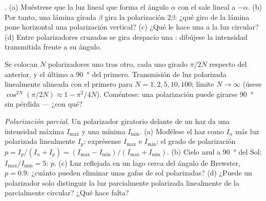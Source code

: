 \begin{exercise}[$\star\star$]\label{exo:b2:plane-waves-polarization:7}
. (a) Muéstrese que la luz lineal que forma el ángulo $\alpha$ con el
 sale lineal a $-\alpha$. (b) Por tanto, una lámina girada $\beta$
gira la polarización $2\beta$: ¿qué giro de la lámina pone horizontal una
polarización vertical? (c) ¿Qué le hace una  a la
luz circular? (d) Entre polarizadores cruzados se gira despacio una : dibújese la intensidad transmitida frente a su ángulo.
\end{exercise}

\begin{exercise}[$\star\star$]\label{exo:b2:plane-waves-polarization:8}
Se colocan $N$ polarizadores uno tras otro, cada uno girado $\pi/2N$
respecto del anterior, y el último a \qty{90}{\degree} del primero.
Transmisión de luz polarizada linealmente alineada con el primero para
$N = 1, 2, 5, 10, 100$; límite $N \to \infty$ (úsese $\cos^{2N}(\pi/2N) \approx
1 - \pi^2/4N$). Coméntese: una polarización puede girarse \qty{90}{\degree}
sin pérdida --- ¿con qué?
\end{exercise}

\begin{exercise}[$\star\star$]\label{exo:b2:plane-waves-polarization:9}
\emph{Polarización parcial.} Un polarizador giratorio delante de un haz da
una intensidad máxima $I_{\max}$ y una mínima $I_{\min}$. (a) Modélese el
haz como  $I_n$ más luz polarizada linealmente $I_p$: exprésense
$I_{\max}$ e $I_{\min}$; el grado de polarización $p = I_p/(I_n + I_p) =
(I_{\max} - I_{\min})/(I_{\max} + I_{\min})$. (b) Cielo azul a \qty{90}{\degree} del
Sol: $I_{\max}/I_{\min} = 5$: $p$. (c) Luz reflejada en un lago cerca del
ángulo de Brewster, $p = 0.9$: ¿cuánto pueden eliminar unas gafas de sol
polarizadas? (d) ¿Puede un polarizador solo distinguir la luz parcialmente
polarizada linealmente de la parcialmente circular? ¿Qué hace falta?
\end{exercise}

